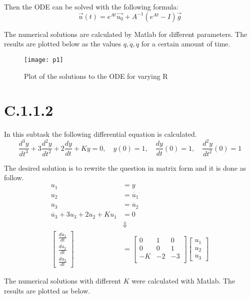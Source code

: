 \documentclass[11pt,a4paper,roman]{scrartcl}
\begin{document}
Then the ODE can be solved with the following formula: 
\[
\vec{u}(t) = e^{At}\vec{u_0} + A^{-1}(e^{At}-I)\vec{g}
\]

The numerical solutions are calculated by Matlab for different parameters. The results are plotted below as the values $q, \dot{q}, \ddot{q}$ for a certain amount of time. 

\begin{figure}[h]
\centering
\texttt{[image: p1]}
\caption{Plot of the solutions to the ODE for varying R}
\label{solplot1}
\end{figure}


\section*{C.1.1.2}
In this subtask the following differential equation is calculated.
\begin{equation}
\frac{d^3y}{dt^3}+3\frac{d^2y}{dt^2}+2\frac{dy}{dt}+Ky = 0,\quad y(0)=1,\quad \frac{dy}{dt}(0)=1,\quad \frac{d^2y}{dt^2}(0) = 1
\end{equation}

The desired solution is to rewrite the question in matrix form and it is done as follow. 
\begin{equation} \begin{aligned}
u_1 & = y \\ u_2 & = \dot{u_1} \\ u_3 & = \dot{u_2} \\
\dot{u_3} + 3u_3 + 2u_2 + Ku_1 & = 0 \\ 
& \Downarrow \\ 
\begin{bmatrix} \frac{du_1}{dt} \\ \frac{du_2}{dt} \\ \frac{du_3}{dt} \end{bmatrix} & = 
\begin{bmatrix} 0 & 1 & 0 \\ 0 & 0 & 1 \\ -K & -2 & -3 \\ \end{bmatrix} 
\begin{bmatrix} u_1 \\ u_2 \\ u_3 \end{bmatrix}
\end{aligned} \end{equation}

The numerical solutions with different $K$ were calculated with Matlab. The results are plotted as below. 
\end{document}
